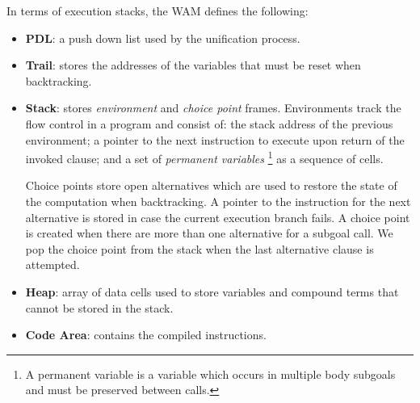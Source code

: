 \begin{samepage}
   
In terms of execution stacks, the WAM defines the following:

\begin{itemize}
  \item \textbf{PDL}: a push down list used by the unification process.
  \item \textbf{Trail}: stores the addresses of the variables that must be reset when backtracking.
  \item \textbf{Stack}: stores \textit{environment} and \textit{choice point} frames.
         Environments track the flow control in a program and consist of: the stack address of the
         previous environment; a pointer to the next instruction to execute upon return of the invoked
         clause; and a set of \textit{permanent variables} \footnote{A permanent variable is a variable
         which occurs in multiple body subgoals and must be preserved between calls.} as a sequence of cells.
         
         Choice points store open alternatives which are used to restore the state of the computation
         when backtracking. A pointer to the instruction for the next alternative is stored in case
         the current execution branch fails.
         A choice point is created when there are more than one alternative for a subgoal call.
         We pop the choice point from the stack when the last alternative clause is attempted. 
  \item \textbf{Heap}: array of data cells used to store variables and compound terms that cannot
         be stored in the stack.
  \item \textbf{Code Area}: contains the compiled instructions.
\end{itemize}

\end{samepage}

